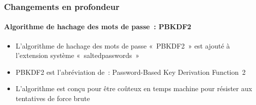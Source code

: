 \begin{frame}[fragile]
	\frametitle{Changements en profondeur}
	\framesubtitle{Algorithme de hachage des mots de passe~: PBKDF2}

	\begin{itemize}

		\item L'algorithme de hachage des mots de passe «~PBKDF2~» est ajouté à l'extension système
			«~saltedpasswords~»

		\item PBKDF2 est l'abréviation de~: Password-Based Key Derivation Function~2

		\item L'algorithme est conçu pour être coûteux en temps machine pour résister aux
			tentatives de force brute

	\end{itemize}

\end{frame}

